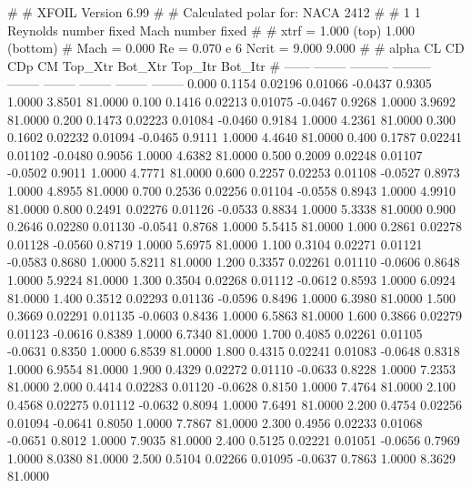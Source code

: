 #  
#       XFOIL         Version 6.99
#  
# Calculated polar for: NACA 2412                                       
#  
# 1 1 Reynolds number fixed          Mach number fixed         
#  
# xtrf =   1.000 (top)        1.000 (bottom)  
# Mach =   0.000     Re =     0.070 e 6     Ncrit =   9.000  9.000
#  
#   alpha    CL        CD       CDp       CM     Top_Xtr  Bot_Xtr  Top_Itr  Bot_Itr
#  ------ -------- --------- --------- -------- -------- -------- -------- --------
   0.000   0.1154   0.02196   0.01066  -0.0437   0.9305   1.0000   3.8501  81.0000
   0.100   0.1416   0.02213   0.01075  -0.0467   0.9268   1.0000   3.9692  81.0000
   0.200   0.1473   0.02223   0.01084  -0.0460   0.9184   1.0000   4.2361  81.0000
   0.300   0.1602   0.02232   0.01094  -0.0465   0.9111   1.0000   4.4640  81.0000
   0.400   0.1787   0.02241   0.01102  -0.0480   0.9056   1.0000   4.6382  81.0000
   0.500   0.2009   0.02248   0.01107  -0.0502   0.9011   1.0000   4.7771  81.0000
   0.600   0.2257   0.02253   0.01108  -0.0527   0.8973   1.0000   4.8955  81.0000
   0.700   0.2536   0.02256   0.01104  -0.0558   0.8943   1.0000   4.9910  81.0000
   0.800   0.2491   0.02276   0.01126  -0.0533   0.8834   1.0000   5.3338  81.0000
   0.900   0.2646   0.02280   0.01130  -0.0541   0.8768   1.0000   5.5415  81.0000
   1.000   0.2861   0.02278   0.01128  -0.0560   0.8719   1.0000   5.6975  81.0000
   1.100   0.3104   0.02271   0.01121  -0.0583   0.8680   1.0000   5.8211  81.0000
   1.200   0.3357   0.02261   0.01110  -0.0606   0.8648   1.0000   5.9224  81.0000
   1.300   0.3504   0.02268   0.01112  -0.0612   0.8593   1.0000   6.0924  81.0000
   1.400   0.3512   0.02293   0.01136  -0.0596   0.8496   1.0000   6.3980  81.0000
   1.500   0.3669   0.02291   0.01135  -0.0603   0.8436   1.0000   6.5863  81.0000
   1.600   0.3866   0.02279   0.01123  -0.0616   0.8389   1.0000   6.7340  81.0000
   1.700   0.4085   0.02261   0.01105  -0.0631   0.8350   1.0000   6.8539  81.0000
   1.800   0.4315   0.02241   0.01083  -0.0648   0.8318   1.0000   6.9554  81.0000
   1.900   0.4329   0.02272   0.01110  -0.0633   0.8228   1.0000   7.2353  81.0000
   2.000   0.4414   0.02283   0.01120  -0.0628   0.8150   1.0000   7.4764  81.0000
   2.100   0.4568   0.02275   0.01112  -0.0632   0.8094   1.0000   7.6491  81.0000
   2.200   0.4754   0.02256   0.01094  -0.0641   0.8050   1.0000   7.7867  81.0000
   2.300   0.4956   0.02233   0.01068  -0.0651   0.8012   1.0000   7.9035  81.0000
   2.400   0.5125   0.02221   0.01051  -0.0656   0.7969   1.0000   8.0380  81.0000
   2.500   0.5104   0.02266   0.01095  -0.0637   0.7863   1.0000   8.3629  81.0000
